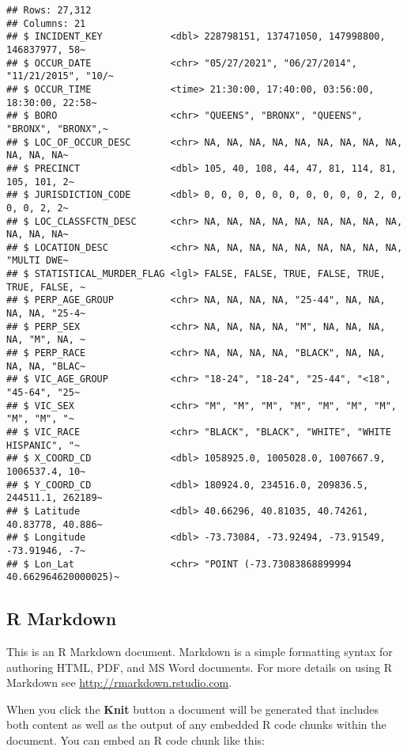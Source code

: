 \documentclass[
]{article}
\begin{document}
\begin{verbatim}
## Rows: 27,312
## Columns: 21
## $ INCIDENT_KEY            <dbl> 228798151, 137471050, 147998800, 146837977, 58~
## $ OCCUR_DATE              <chr> "05/27/2021", "06/27/2014", "11/21/2015", "10/~
## $ OCCUR_TIME              <time> 21:30:00, 17:40:00, 03:56:00, 18:30:00, 22:58~
## $ BORO                    <chr> "QUEENS", "BRONX", "QUEENS", "BRONX", "BRONX",~
## $ LOC_OF_OCCUR_DESC       <chr> NA, NA, NA, NA, NA, NA, NA, NA, NA, NA, NA, NA~
## $ PRECINCT                <dbl> 105, 40, 108, 44, 47, 81, 114, 81, 105, 101, 2~
## $ JURISDICTION_CODE       <dbl> 0, 0, 0, 0, 0, 0, 0, 0, 0, 0, 2, 0, 0, 0, 2, 2~
## $ LOC_CLASSFCTN_DESC      <chr> NA, NA, NA, NA, NA, NA, NA, NA, NA, NA, NA, NA~
## $ LOCATION_DESC           <chr> NA, NA, NA, NA, NA, NA, NA, NA, NA, "MULTI DWE~
## $ STATISTICAL_MURDER_FLAG <lgl> FALSE, FALSE, TRUE, FALSE, TRUE, TRUE, FALSE, ~
## $ PERP_AGE_GROUP          <chr> NA, NA, NA, NA, "25-44", NA, NA, NA, NA, "25-4~
## $ PERP_SEX                <chr> NA, NA, NA, NA, "M", NA, NA, NA, NA, "M", NA, ~
## $ PERP_RACE               <chr> NA, NA, NA, NA, "BLACK", NA, NA, NA, NA, "BLAC~
## $ VIC_AGE_GROUP           <chr> "18-24", "18-24", "25-44", "<18", "45-64", "25~
## $ VIC_SEX                 <chr> "M", "M", "M", "M", "M", "M", "M", "M", "M", "~
## $ VIC_RACE                <chr> "BLACK", "BLACK", "WHITE", "WHITE HISPANIC", "~
## $ X_COORD_CD              <dbl> 1058925.0, 1005028.0, 1007667.9, 1006537.4, 10~
## $ Y_COORD_CD              <dbl> 180924.0, 234516.0, 209836.5, 244511.1, 262189~
## $ Latitude                <dbl> 40.66296, 40.81035, 40.74261, 40.83778, 40.886~
## $ Longitude               <dbl> -73.73084, -73.92494, -73.91549, -73.91946, -7~
## $ Lon_Lat                 <chr> "POINT (-73.73083868899994 40.662964620000025)~
\end{verbatim}

\hypertarget{r-markdown}{%
\subsection{R Markdown}\label{r-markdown}}

This is an R Markdown document. Markdown is a simple formatting syntax
for authoring HTML, PDF, and MS Word documents. For more details on
using R Markdown see \url{http://rmarkdown.rstudio.com}.

When you click the \textbf{Knit} button a document will be generated
that includes both content as well as the output of any embedded R code
chunks within the document. You can embed an R code chunk like this:
\end{document}
